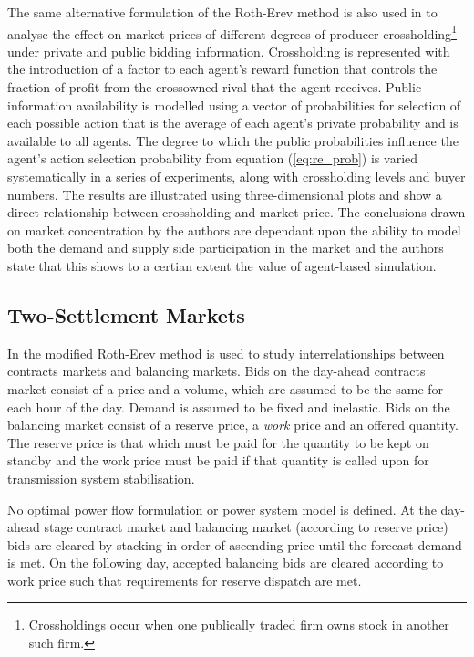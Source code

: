 The same alternative formulation of the Roth-Erev method is also used in
\cite{micola:08b} to analyse the effect on market prices of different degrees
of producer crossholding\footnote{Crossholdings occur when one publically
traded firm owns stock in another such firm.} under private and public bidding
information.  Crossholding is represented with the introduction of a factor
to each agent's reward function that controls the fraction of profit from
the crossowned rival that the agent receives.  Public information availability
is modelled using a vector of probabilities for selection of each
possible action that is the average of each agent's private probability and is
available to all agents. The degree to which the public probabilities
influence the agent's action selection probability from equation (\ref{eq:re_prob}) is varied
systematically in a series of experiments, along with crossholding levels and
buyer numbers.  The results are illustrated using three-dimensional
plots and show a direct relationship between crossholding and market price.
The conclusions drawn on market concentration by the authors are dependant upon
the ability to model both the demand and supply side participation in the
market and the authors state that this shows to a certian extent the value
of agent-based simulation.

\subsection{Two-Settlement Markets}
In \cite{weidlich:06} the modified Roth-Erev method is used to study
interrelationships between contracts markets and balancing markets.  Bids on the
day-ahead contracts market consist of a price and a volume, which are assumed to
be the same for each hour of the day.  Demand is assumed to be fixed and
inelastic.  Bids on the balancing market consist of a reserve price, a
\textit{work} price and an offered quantity.  The reserve price is that which
must be paid for the quantity to be kept on standby and the work price must be
paid if that quantity is called upon for transmission system stabilisation.

No optimal power flow formulation or power system model is defined.  At the
day-ahead stage contract market and balancing market (according to reserve
price) bids are cleared by stacking in order of ascending price until the
forecast demand is met.  On the following day, accepted balancing bids are
cleared according to work price such that requirements for reserve dispatch
are met.

